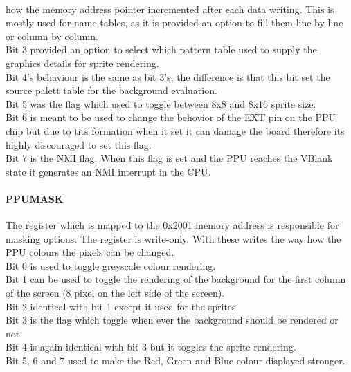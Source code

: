 \documentclass[]{report}
\begin{document}
\paragraph{ }how the memory address pointer incremented after each data writing. This is mostly used for name tables, as it is provided an option to fill them line by line or column by column.
\\
Bit 3 provided an option to select which pattern table used to supply the graphics details for sprite rendering.
\\
Bit 4's behaviour is the same as bit 3's, the difference is that this bit set the source palett table for the background evaluation.
\\
Bit 5 was the flag which used to toggle between 8x8 and 8x16 sprite size.
\\
Bit 6 is meant to be used to change the behovior of the EXT pin on the PPU chip but due to tits formation when it set it can damage the board therefore its highly discouraged to set this flag.
\\
Bit 7 is the NMI flag. When this flag is set and the PPU reaches the VBlank state it generates an NMI interrupt in the CPU.

\paragraph{PPUMASK}
The register which is mapped to the 0x2001 memory address is responsible for masking options. The register is write-only. With these writes the way how the PPU colours the pixels can be changed.
\\
Bit 0 is used to toggle greyscale colour rendering.
\\
Bit 1 can be used to toggle the rendering of the background for the first column of the screen (8 pixel on the left side of the screen).
\\
Bit 2 identical with bit 1 except it used for the sprites.
\\
Bit 3 is the flag which toggle when ever the background should be rendered or not.
\\
Bit 4 is again identical with bit 3 but it toggles the sprite rendering.
\\
Bit 5, 6 and 7 used to make the Red, Green and Blue colour  displayed stronger.
\end{document}
